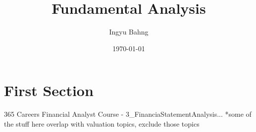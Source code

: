 \documentclass[10pt]{article}
\title{Fundamental Analysis}
\date{\today}
\author{Ingyu Bahng}
\begin{document}


\section{First Section}

365 Careers Financial Analyst Course
- 3_FinanciaStatementAnalysis... *some of the stuff here overlap with valuation topics, exclude those topics





\end{document}
